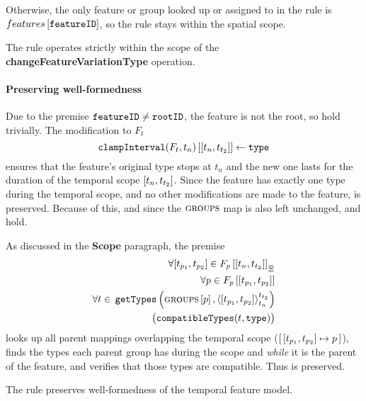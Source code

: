 Otherwise, the only feature or group looked up or assigned to in the rule is $features \left[ \texttt{featureID} \right]$, so the rule stays within the spatial scope.
\\

\begin{lemma}
   The  rule operates strictly within the scope of the \textbf{changeFeatureVariationType} operation.
   \label{lemma:change-feature-variation-type-scope}
\end{lemma}

\paragraph{Preserving well-formedness}
Due to the premise $\texttt{featureID} \neq \texttt{rootID}$, the feature is not the root, so  hold trivially. The modification to $F_t$
\[
   \lookup{\var{clampInterval}(F_t, t_n)}{\interval{t_n}{t_{t_2}}} \assign \var{type}
\]
ensures that the feature's original type stops at $t_n$ and the new one lasts for the duration of the temporal scope $\interval{t_n}{t_{t_2}}$. Since the feature has exactly one type during the temporal scope, and no other modifications are made to the feature,  is preserved. Because of this, and since the $\textsc{groups}{}{}$ map is also left unchanged,  and  hold. 

As discussed in the \textbf{Scope} paragraph, the premise 
\[
   \begin{split}
      \forall \interval{t_{p_1}}{t_{p_2}} \in \overlapping{F_p}{t_n}{t_{t_2}}  \\ %
      \forall p \in \lookup{F_p}{\interval{t_{p_1}}{t_{p_2}}}  \\%
      \forall t \in \, \var{getTypes}\left(\lookup{\groups}{p}, \clamp{\interval{t_{p_1}}{t_{p_2}}}{t_n}{t_{t_2}}\right)  \\
          \big(\var{compatibleTypes}(t, \var{type})\big) 
    \end{split}
\]
looks up all parent mappings overlapping the temporal scope ($\intervalmapping{t_{p_1}}{t_{p_2}}{p}$), finds the types each parent group has during the scope and \emph{while} it is the parent of the feature, and verifies that those types are compatible. Thus  is preserved.
\\

\begin{lemma}
   The  rule preserves well-formedness of the temporal feature model. 
   \label{lemma:change-feature-variation-type-well-formed}
\end{lemma}

